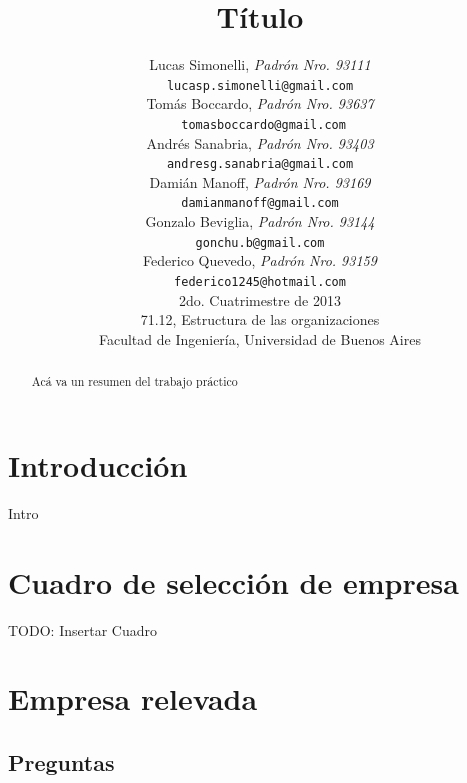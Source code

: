 \documentclass[a4paper,10pt]{article}
\title{		\textbf{Título}}
\author{	Lucas Simonelli, \textit{Padrón Nro. 93111}                     \\
            \texttt{ lucasp.simonelli@gmail.com }                                              \\[2.5ex]
            Tomás Boccardo, \textit{Padrón Nro. 93637}                     \\
            \texttt{ tomasboccardo@gmail.com}                                              \\[2.5ex]
            Andrés Sanabria, \textit{Padrón Nro. 93403}                     \\
            \texttt{ andresg.sanabria@gmail.com  }                                              \\[2.5ex]
            Dami\'an Manoff, \textit{Padrón Nro. 93169}                     \\
            \texttt{ damianmanoff@gmail.com  }                                              \\[2.5ex]
            Gonzalo Beviglia, \textit{Padrón Nro. 93144}                     \\
            \texttt{ gonchu.b@gmail.com  }                                              \\[2.5ex]
            Federico Quevedo, \textit{Padrón Nro. 93159}                     \\
            \texttt{ federico1245@hotmail.com  }                                              \\[2.5ex]
            \normalsize{2do. Cuatrimestre de 2013}                                      \\
            \normalsize{71.12, Estructura de las organizaciones}  \\
            \normalsize{Facultad de Ingeniería, Universidad de Buenos Aires}            \\
       }
\date{}
\begin{document}
\maketitle
\thispagestyle{empty}   %



\begin{abstract}
Acá va un resumen del trabajo práctico
\end{abstract}

\newpage
\tableofcontents
\newpage
\section{Introducción}
Intro
\section{Cuadro de selección de empresa}
TODO: Insertar Cuadro
\section{Empresa relevada}
	\subsection{Preguntas}
\end{document}
